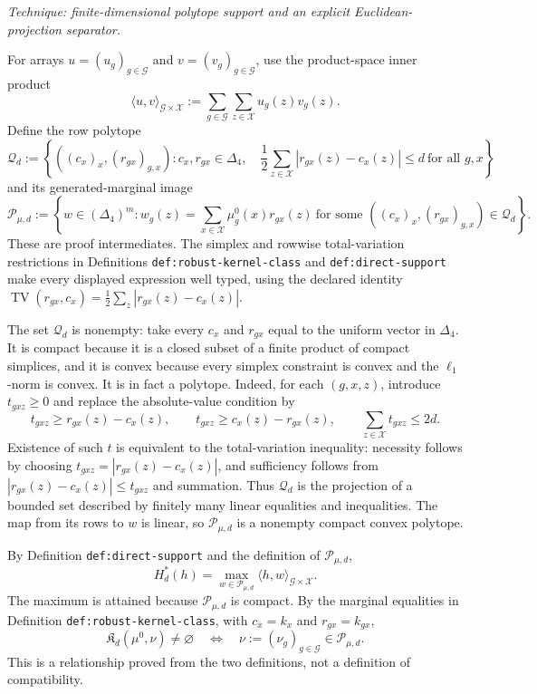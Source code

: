 \emph{Technique: finite-dimensional polytope support and an explicit Euclidean-projection separator.}

For arrays \(u=(u_g)_{g\in\mathcal G}\) and \(v=(v_g)_{g\in\mathcal G}\), use the product-space inner product
\[
 \langle u,v\rangle_{\mathcal G\times\mathcal X}
 :=\sum_{g\in\mathcal G}\sum_{z\in\mathcal X}u_g(z)v_g(z).
\]
Define the row polytope
\[
 \mathcal Q_d:=\left\{((c_x)_x,(r_{gx})_{g,x}):
 c_x,r_{gx}\in\Delta_4,\quad
 \frac12\sum_{z\in\mathcal X}|r_{gx}(z)-c_x(z)|\le d
 \ \text{for all }g,x\right\}
\]
and its generated-marginal image
\[
 \mathcal P_{\mu,d}:=\left\{w\in(\Delta_4)^m:
 w_g(z)=\sum_{x\in\mathcal X}\mu_g^0(x)r_{gx}(z)
 \ \text{for some }((c_x)_x,(r_{gx})_{g,x})\in\mathcal Q_d\right\}.
\]
These are proof intermediates.  The simplex and rowwise total-variation restrictions in Definitions \texttt{def:robust-kernel-class} and \texttt{def:direct-support} make every displayed expression well typed, using the declared identity
\(\operatorname{TV}(r_{gx},c_x)=\frac12\sum_z|r_{gx}(z)-c_x(z)|\).

The set \(\mathcal Q_d\) is nonempty: take every \(c_x\) and \(r_{gx}\) equal to the uniform vector in \(\Delta_4\).  It is compact because it is a closed subset of a finite product of compact simplices, and it is convex because every simplex constraint is convex and the \(\ell_1\)-norm is convex.  It is in fact a polytope.  Indeed, for each \((g,x,z)\), introduce \(t_{gxz}\ge0\) and replace the absolute-value condition by
\[
 t_{gxz}\ge r_{gx}(z)-c_x(z),\qquad
 t_{gxz}\ge c_x(z)-r_{gx}(z),\qquad
 \sum_{z\in\mathcal X}t_{gxz}\le2d.
\]
Existence of such \(t\) is equivalent to the total-variation inequality: necessity follows by choosing
\(t_{gxz}=|r_{gx}(z)-c_x(z)|\), and sufficiency follows from
\(|r_{gx}(z)-c_x(z)|\le t_{gxz}\) and summation.  Thus \(\mathcal Q_d\) is the projection of a bounded set described by finitely many linear equalities and inequalities.  The map from its rows to \(w\) is linear, so \(\mathcal P_{\mu,d}\) is a nonempty compact convex polytope.

By Definition \texttt{def:direct-support} and the definition of \(\mathcal P_{\mu,d}\),
\[
 H_d^*(h)
 =\max_{w\in\mathcal P_{\mu,d}}
   \langle h,w\rangle_{\mathcal G\times\mathcal X}.
 \tag{1}
\]
The maximum is attained because \(\mathcal P_{\mu,d}\) is compact.  By the marginal equalities in Definition \texttt{def:robust-kernel-class}, with \(c_x=k_x\) and \(r_{gx}=k_{gx}\),
\[
 \mathfrak K_d(\mu^0,\nu)\ne\varnothing
 \quad\Longleftrightarrow\quad
 \nu:=(\nu_g)_{g\in\mathcal G}\in\mathcal P_{\mu,d}.
 \tag{2}
\]
This is a relationship proved from the two definitions, not a definition of compatibility.

